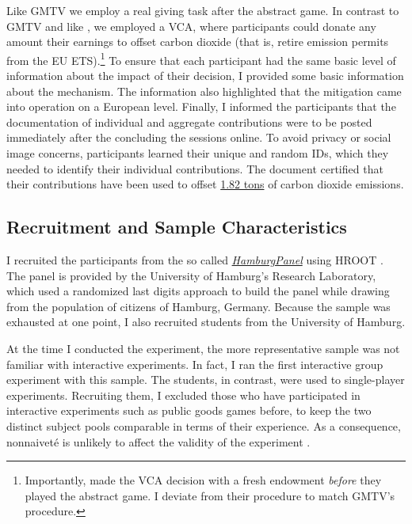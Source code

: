 \documentclass[
  authoryear,
  preprint,
  3p]{elsarticle}
\begin{document}
Like GMTV we employ a real giving task after the abstract game. In
contrast to GMTV and like \citet{GKLS2020}, we employed a VCA, where
participants could donate any amount their earnings to offset carbon
dioxide (that is, retire emission permits from the EU ETS).\footnote{Importantly,
  \citet{GKLS2020} made the VCA decision with a fresh endowment
  \emph{before} they played the abstract game. I deviate from their
  procedure to match GMTV's procedure.} To ensure that each participant
had the same basic level of information about the impact of their
decision, I provided some basic information about the mechanism. The
information also highlighted that the mitigation came into operation on
a European level. Finally, I informed the participants that the
documentation of individual and aggregate contributions were to be
posted immediately after the concluding the sessions online. To avoid
privacy or social image concerns, participants learned their unique and
random IDs, which they needed to identify their individual
contributions. The document certified that their contributions have been
used to offset
\href{https://www.compensators.org/compensatelist/?searchterm=stefan+traub}{1.82
tons} of carbon dioxide emissions.

\hypertarget{sec-sample}{%
\subsection{Recruitment and Sample Characteristics}\label{sec-sample}}

I recruited the participants from the so called
\emph{\href{https://www.wiso.uni-hamburg.de/forschung/forschungslabor/umfragelabor/aktuelle-umfragen/hamburgpanel.html}{HamburgPanel}}
using HROOT \citep{hroot}. The panel is provided by the University of
Hamburg's Research Laboratory, which used a randomized last digits
approach to build the panel while drawing from the population of
citizens of Hamburg, Germany. Because the sample was exhausted at one
point, I also recruited students from the University of Hamburg.

At the time I conducted the experiment, the more representative sample
was not familiar with interactive experiments. In fact, I ran the first
interactive group experiment with this sample. The students, in
contrast, were used to single-player experiments. Recruiting them, I
excluded those who have participated in interactive experiments such as
public goods games before, to keep the two distinct subject pools
comparable in terms of their experience. As a consequence, nonnaiveté is
unlikely to affect the validity of the experiment \citep[
p.~204]{GoodmanPaolacci2017}.
\end{document}
